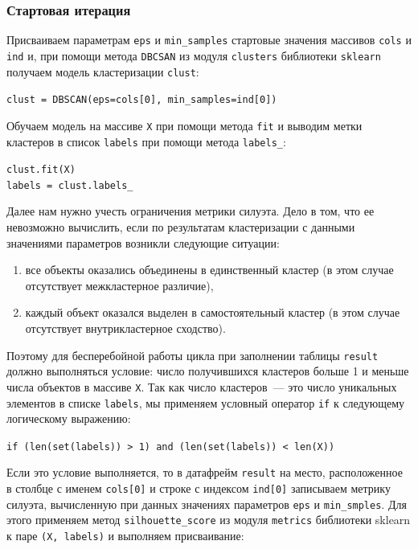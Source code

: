 \documentclass[a4paper,12pt]{article}
\begin{document}
\subsubsection{Стартовая итерация}

Присваиваем параметрам \texttt{eps} и \texttt{min\_samples} стартовые значения массивов \texttt{cols} и \texttt{ind} и, при помощи метода \texttt{DBCSAN} из модуля \texttt{clusters} библиотеки \texttt{sklearn} получаем модель кластеризации \texttt{clust}:


\medskip\noindent
\texttt{clust = DBSCAN(eps=cols[0], min\_samples=ind[0])}

\medskip\noindent
Обучаем модель на массиве \texttt{X} при помощи метода \texttt{fit} и выводим метки кластеров в список \texttt{labels} при помощи метода \texttt{labels\_}:

\medskip\noindent
\texttt{clust.fit(X)\\
labels = clust.labels\_}

\medskip\noindent
Далее нам нужно учесть ограничения метрики силуэта. Дело в том, что ее невозможно вычислить, если по результатам кластеризации с данными значениями параметров возникли следующие ситуации:

\medskip\noindent
\begin{enumerate}
	\item все объекты оказались объединены в единственный кластер (в этом случае отсутствует межкластерное различие),
	\item каждый объект оказался выделен в самостоятельный кластер (в этом случае отсутствует внутрикластерное сходство).
\end{enumerate}


\medskip\noindent
Поэтому для бесперебойной работы цикла при заполнении таблицы \texttt{result} должно выполняться условие: число получившихся кластеров больше 1 и меньше числа объектов в массиве \texttt{X}. Так как число кластеров — это число уникальных элементов в списке \texttt{labels}, мы применяем условный оператор \texttt{if} к следующему логическому выражению:

\medskip\noindent
\texttt{if (len(set(labels)) > 1) and (len(set(labels)) < len(X))}

\medskip\noindent
Если это условие выполняется, то в датафрейм \texttt{result} на место, расположенное в столбце с именем \texttt{cols[0]} и строке с индексом \texttt{ind[0]} записываем метрику силуэта, вычисленную при данных значениях параметров \texttt{eps} и \texttt{min\_smples}. Для этого применяем метод \texttt{silhouette\_score} из модуля \texttt{metrics} библиотеки sklearn к паре \texttt{(X, labels)} и выполняем присваивание:
\end{document}
